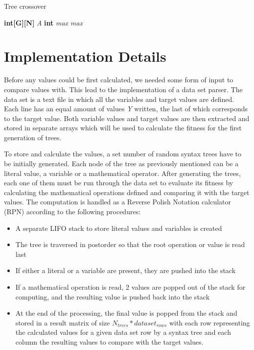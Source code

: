 \documentclass[runningheads]{llncs}
\begin{document}
\begin{algorithm}
\caption{Tree crossover}
\begin{algorithmic}[1]
\State \textbf{int[G][N]} \textit{A}
\EndFor
{}
\State \textbf{int} \textit{max}
	\EndFor
\Else {}
	\EndFor
\Else
	\EndFor
\EndIf
\EndIf
\EndFor
\State \Return \textit{max}
\EndProcedure
\end{algorithmic}
\label{crossover_alg}
\end{algorithm}


\section{Implementation Details}
Before any values could be first calculated, we needed some form of input to compare values with. This lead to the implementation of a data set parser. The data set is a text file in which all the variables and target values are defined. Each line has an equal amount of values \textit{Y} written, the last of which corresponds to the target value. Both variable values and target values are then extracted and stored in separate arrays which will be used to calculate the fitness for the first generation of trees.

To store and calculate the values, a set number of random syntax trees have to be initially generated. Each node of the tree as previously mentioned can be a literal value, a variable or a mathematical operator. After generating the trees, each one of them must be run through the data set to evaluate its fitness by calculating the mathematical operations defined and comparing it with the target values. The computation is handled as a Reverse Polish Notation calculator (RPN) according to the following procedures:
\begin{itemize}
	\item A separate LIFO stack to store literal values and variables is created
	\item The tree is traversed in postorder so that the root operation or value is read last
	\item If either a literal or a variable are present, they are pushed into the stack
	\item If a mathematical operation is read, 2 values are popped out of the stack for computing, and the resulting value is pushed back into the stack
	\item At the end of the processing, the final value is popped from the stack and stored in a result matrix of size $N_{trees}*dataset_{rows}$ with each row representing the calculated values for a given data set row by a syntax tree and each column the resulting values to compare with the target values.
\end{itemize}
\end{document}
